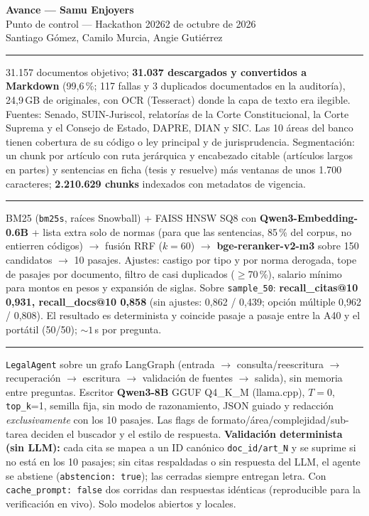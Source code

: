 \documentclass[10pt,letterpaper]{article}
\newcommand{\seccion}[1]{\vspace{3pt}{\large\bfseries #1}\par\vspace{-2pt}\hrule\vspace{3pt}}
\begin{document}
{\LARGE\bfseries Avance --- Samu Enjoyers}\\[1pt]
{\large Punto de control --- Hackathon 2026}\hfill 2 de octubre de 2026\\[1pt]
Santiago Gómez, Camilo Murcia, Angie Gutiérrez\par

\seccion{1. Corpus y descarga}
31.157 documentos objetivo; \textbf{31.037 descargados y convertidos a Markdown} (99,6\,\%; 117 fallas y 3 duplicados documentados en la auditoría), 24,9\,GB de originales, con OCR (Tesseract) donde la capa de texto era ilegible. Fuentes: Senado, SUIN-Juriscol, relatorías de la Corte Constitucional, la Corte Suprema y el Consejo de Estado, DAPRE, DIAN y SIC. Las 10 áreas del banco tienen cobertura de su código o ley principal y de jurisprudencia. Segmentación: un chunk por artículo con ruta jerárquica y encabezado citable (artículos largos en partes) y sentencias en ficha (tesis y resuelve) más ventanas de unos 1.700 caracteres; \textbf{2.210.629 chunks} indexados con metadatos de vigencia.

\seccion{2. Recuperación híbrida (congelada)}
BM25 (\texttt{bm25s}, raíces Snowball) + FAISS HNSW SQ8 con \textbf{Qwen3-Embedding-0.6B} + lista extra solo de normas (para que las sentencias, 85\,\% del corpus, no entierren códigos) $\to$ fusión RRF ($k{=}60$) $\to$ \textbf{bge-reranker-v2-m3} sobre 150 candidatos $\to$ 10 pasajes. Ajustes: castigo por tipo y por norma derogada, tope de pasajes por documento, filtro de casi duplicados ($\geq$70\,\%), salario mínimo para montos en pesos y expansión de siglas. Sobre \texttt{sample\_50}: \textbf{recall\_citas@10 0,931, recall\_docs@10 0,858} (sin ajustes: 0,862 / 0,439; opción múltiple 0,962 / 0,808). El resultado es determinista y coincide pasaje a pasaje entre la A40 y el portátil (50/50); ${\sim}1$\,s por pregunta.

\seccion{3. Agente y grounding}
\texttt{LegalAgent} sobre un grafo LangGraph (entrada $\to$ consulta/reescritura $\to$ recuperación $\to$ escritura $\to$ validación de fuentes $\to$ salida), sin memoria entre preguntas. Escritor \textbf{Qwen3-8B} GGUF Q4\_K\_M (llama.cpp), $T{=}0$, \texttt{top\_k}=1, semilla fija, sin modo de razonamiento, JSON guiado y redacción \emph{exclusivamente} con los 10 pasajes. Las flags de formato/área/complejidad/sub-tarea deciden el buscador y el estilo de respuesta. \textbf{Validación determinista (sin LLM):} cada cita se mapea a un ID canónico \texttt{doc\_id/art\_N} y se suprime si no está en los 10 pasajes; sin citas respaldadas o sin respuesta del LLM, el agente se abstiene (\texttt{abstencion: true}); las cerradas siempre entregan letra. Con \texttt{cache\_prompt: false} dos corridas dan respuestas idénticas (reproducible para la verificación en vivo). Solo modelos abiertos y locales.
\end{document}
